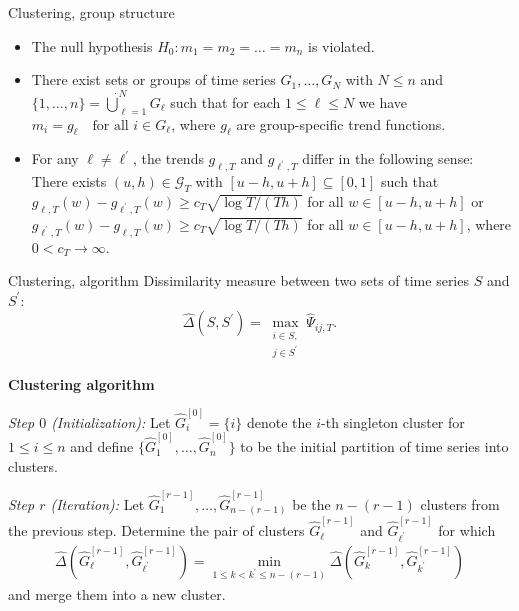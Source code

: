\documentclass[10pt]{beamer}
\begin{document}
\begin{frame}{Clustering, group structure}
\begin{itemize}
\item The null hypothesis $H_0: m_1 = m_2 = \ldots = m_n$ is violated.\pause
\item There exist sets or groups of time series $G_1,\ldots,G_N$ with $N \le n$ and $\{1,\ldots,n\} = \mathbin{\dot{\bigcup}}_{\ell=1}^{N} G_\ell$ such that for each $1 \le \ell \le N$ we have $m_i = g_\ell \quad \text{for all } i \in G_\ell$, where $g_\ell$ are group-specific trend functions.\pause
\item For any $\ell \ne \ell^\prime$, the trends $g_{\ell,T}$ and $g_{\ell^\prime,T}$ differ in the following sense: There exists $(u,h) \in \mathcal{G}_T$ with $[u-h,u+h] \subseteq [0,1]$ such that $g_{\ell,T}(w) - g_{\ell^\prime,T}(w) \ge c_T \sqrt{\log T/(Th)}$ for all $w \in [u-h,u+h]$ or $g_{\ell^\prime,T}(w) - g_{\ell,T}(w) \ge c_T \sqrt{\log T/(Th)}$ for all $w \in [u-h,u+h]$, where $0 < c_T \rightarrow \infty$.
\end{itemize}
\end{frame}

\begin{frame}{Clustering, algorithm}
Dissimilarity measure between two sets of time series $S$ and $S^{\prime}$:
\begin{equation*}\label{dissimilarity}
\widehat{\Delta}(S,S^\prime) = \max_{\substack{i \in S, \\ j \in S^\prime}} \widehat{\Psi}_{ij,T}. 
\end{equation*}
\begin{center}
\textbf{Clustering algorithm}
\end{center}

\textit{Step $0$ (Initialization):} Let $\widehat{G}_i^{[0]} = \{ i \}$ denote the $i$-th singleton cluster for $1 \le i \le n$ and define $\{\widehat{G}_1^{[0]},\ldots,\widehat{G}_n^{[0]} \}$ to be the initial partition of time series into clusters. 

\noindent \textit{Step $r$ (Iteration):} Let $\widehat{G}_1^{[r-1]},\ldots,\widehat{G}_{n-(r-1)}^{[r-1]}$ be the $n-(r-1)$ clusters from the previous step. Determine the pair of clusters $\widehat{G}_{\ell}^{[r-1]}$ and $\widehat{G}_{{\ell}^\prime}^{[r-1]}$ for which 
\begin{align*}
\widehat{\Delta}(\widehat{G}_{\ell}^{[r-1]},\widehat{G}_{{\ell}^\prime}^{[r-1]}) = \min_{1 \le k < k^\prime \le n-(r-1)} \widehat{\Delta}(\widehat{G}_{k}^{[r-1]},\widehat{G}_{k^\prime}^{[r-1]})
\end{align*}
and merge them into a new cluster. 
\end{frame}
\end{document}
